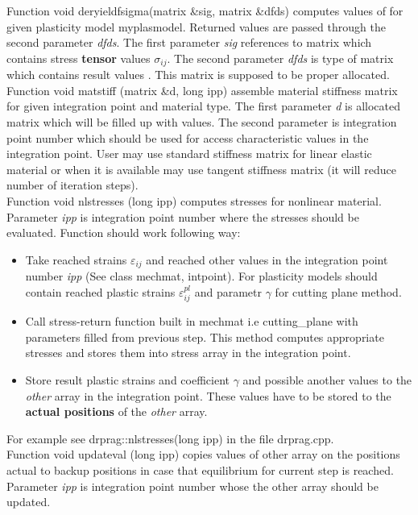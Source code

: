 Function {\sf void deryieldfsigma(matrix \&sig, matrix \&dfds)} computes values of 
for given plasticity model {\sf myplasmodel}. Returned values are passed through the second parameter
{\it dfds}. The first parameter {\it sig} references to matrix which contains stress {\bf tensor}
values $\sigma_{ij}$. The second parameter {\it dfds} is type of matrix which contains result values
. This matrix is supposed to be proper allocated.\\

Function {\sf void matstiff (matrix \&d, long ipp)} assemble material stiffness matrix for given
integration point and material type. The first parameter {\it d} is allocated matrix which will be
filled up with values. The second parameter is integration point number which should be used for
access characteristic values in the integration point. User may use standard stiffness matrix for
linear elastic material or when it is available may use tangent stiffness matrix (it will reduce
number of iteration steps).\\

Function {\sf void nlstresses (long ipp)} computes stresses for nonlinear material. Parameter
{\it ipp} is integration point number where the stresses should be evaluated. Function should
work following way:
\begin{itemize}
\item
Take reached strains $\varepsilon_{ij}$ and reached {\sf other} values in the integration point number
{\it ipp} (See class {\sf mechmat, intpoint}). For plasticity models should contain reached plastic
strains $\varepsilon^{pl}_{ij}$ and parametr $\gamma$ for cutting plane method.
\item
Call stress-return function built in {\sf mechmat} i.e {\sf cutting\_plane} with parameters filled from
previous step. This method computes appropriate stresses and stores them into stress array in the
integration point.
\item
Store result plastic strains and coefficient $\gamma$ and possible another values to the {\it other}
array in the integration point. These values have to be stored to the {\bf actual positions} of the
{\it other} array.
\end{itemize}
For example see {\sf drprag::nlstresses(long ipp)} in the file drprag.cpp.\\

Function {\sf void updateval (long ipp)} copies values of {\sf other} array on the positions actual to
backup positions in case that equilibrium for current step is reached. Parameter {\it ipp} is
integration point number whose the {\sf other} array should be updated.


